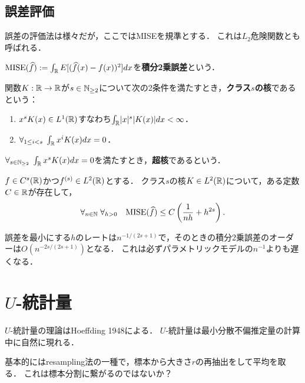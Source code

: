 \documentclass[uplatex,dvipdfmx]{jsreport}
\begin{document}
\subsection{誤差評価}

\begin{tcolorbox}[colframe=ForestGreen, colback=ForestGreen!10!white,breakable,colbacktitle=ForestGreen!40!white,coltitle=black,fonttitle=\bfseries\sffamily,
title=]
    誤差の評価法は様々だが，ここではMISEを規準とする．
    これは$L_2$危険関数とも呼ばれる．
\end{tcolorbox}

\begin{definition}
    $\mathrm{MISE}(\widehat{f}):=\int_{\mathbb{R}} E[(\widehat{f}(x)-f(x))^2]dx$を\textbf{積分2乗誤差}という．
\end{definition}

\begin{definition}
    関数$K:\mathbb{R}\to\mathbb{R}$が$s\in\mathbb{N}_{\ge2}$について次の2条件を満たすとき，\textbf{クラス$s$の核}であるという：
    \begin{enumerate}
        \item $x^sK(x)\in L^1(\mathbb{R})$すなわち$\int_{\mathbb{R}}\lvert x\rvert^s\lvert K(x)\rvert dx<\infty$．
        \item $\forall_{1\le i<s}\;\int_{\mathbb{R}} x^iK(x)dx=0$．
    \end{enumerate}
    $\forall_{s\in\mathbb{N}_{\ge2}}\;\int_{\mathbb{R}} x^sK(x)dx=0$を満たすとき，\textbf{超核}であるという．
\end{definition}

\begin{theorem}
    $f\in C^s(\mathbb{R})$かつ$f^{(s)}\in L^2(\mathbb{R})$とする．
    クラス$s$の核$K\in L^2(\mathbb{R})$について，ある定数$C\in\mathbb{R}$が存在して，
    \[\forall_{n\in\mathbb{N}}\;\forall_{h>0}\quad\mathrm{MISE}(\widehat{f})\le C\left(\frac{1}{nh}+h^{2s}\right).\]
\end{theorem}
\begin{remarks}
    誤差を最小にする$h$のレートは$n^{-1/(2s+1)}$で，そのときの積分2乗誤差のオーダーは$O(n^{-2s/(2s+1)})$となる．
    これは必ずパラメトリックモデルの$n^{-1}$よりも遅くなる．
\end{remarks}

\section{$U$-統計量}

\begin{tcolorbox}[colframe=ForestGreen, colback=ForestGreen!10!white,breakable,colbacktitle=ForestGreen!40!white,coltitle=black,fonttitle=\bfseries\sffamily,
title=]
    $U$-統計量の理論はHoeffding 1948による．
    $U$-統計量は最小分散不偏推定量の計算中に自然に現れる．

    基本的にはresampling法の一種で，標本から大きさ$r$の再抽出をして平均を取る．
    これは標本分割に繋がるのではないか？
\end{tcolorbox}
\end{document}
